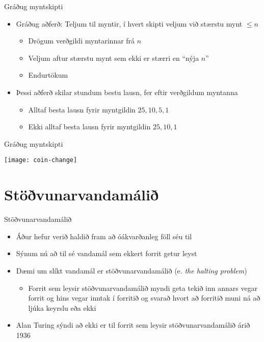 \documentclass{beamer}
\begin{document}
\begin{frame}{Gráðug myntskipti}
\begin{itemize}
 \item Gráðug aðferð: Teljum til myntir, í hvert skipti veljum við stærstu mynt $\leq n$
 \begin{itemize}
  \item Drögum verðgildi myntarinnar frá $n$
  \item Veljum aftur stærstu mynt sem ekki er stærri en ``nýja $n$''
  \item Endurtökum
 \end{itemize}
 \item Þessi aðferð skilar stundum bestu lausn, fer eftir verðgildum myntanna
 \begin{itemize}
  \item Alltaf besta lausn fyrir myntgildin $25, 10, 5, 1$
  \item Ekki alltaf besta lausn fyrir myntgildin $25, 10, 1$
 \end{itemize}
\end{itemize}
\end{frame}

\begin{frame}{Gráðug myntskipti}
\begin{center}
\texttt{[image: coin-change]}
\end{center}
\end{frame}

\section{Stöðvunarvandamálið}

\begin{frame}{Stöðvunarvandamálið}
\begin{itemize}
 \item Áður hefur verið haldið fram að óákvarðanleg föll séu til
 \item Sýnum nú að til sé vandamál sem ekkert forrit getur leyst
 \item Dæmi um slíkt vandamál er stöðvunarvandamálið (e. \emph{the halting problem})
 \begin{itemize}
  \item Forrit sem leysir stöðvunarvandamálið myndi geta tekið inn annars vegar forrit og hins vegar inntak í forritið og svarað hvort að forritið muni ná að ljúka keyrslu eða ekki 
 \end{itemize}
 \item Alan Turing sýndi að ekki er til forrit sem leysir stöðvunarvandamálið árið 1936
\end{itemize}
\end{frame}
\end{document}
